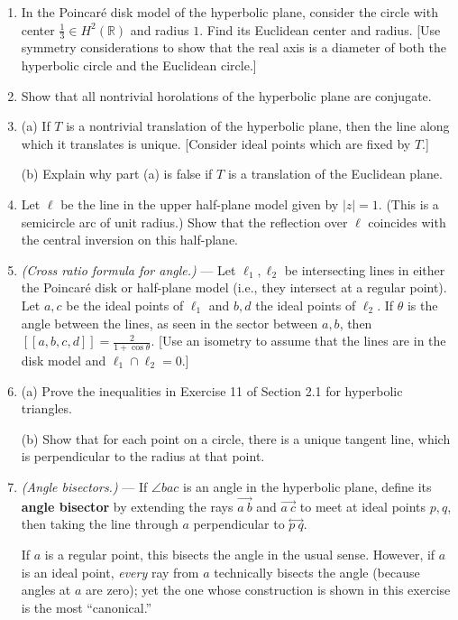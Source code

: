 \documentclass[leqno]{book}
\begin{document}
\begin{enumerate}
\item In the Poincar\'e disk model of the hyperbolic plane, consider the circle with center $\frac 13\in H^2(\mathbb R)$ and radius $1$.  Find its Euclidean center and radius.  [Use symmetry considerations to show that the real axis is a diameter of both the hyperbolic circle and the Euclidean circle.]

\item Show that all nontrivial horolations of the hyperbolic plane are conjugate.

\item (a) If $T$ is a nontrivial translation of the hyperbolic plane, then the line along which it translates is unique.  [Consider ideal points which are fixed by $T$.]

(b) Explain why part (a) is false if $T$ is a translation of the Euclidean plane.

\item Let $\ell$ be the line in the upper half-plane model given by $|z|=1$.  (This is a semicircle arc of unit radius.)  Show that the reflection over $\ell$ coincides with the central inversion on this half-plane.

\item\emph{(Cross ratio formula for angle.)} \---- Let $\ell_1,\ell_2$ be intersecting lines in either the Poincar\'e disk or half-plane model (i.e., they intersect at a regular point).  Let $a,c$ be the ideal points of $\ell_1$ and $b,d$ the ideal points of $\ell_2$.  If $\theta$ is the angle between the lines, as seen in the sector between $a,b$, then $[\![a,b,c,d]\!]=\frac 2{1+\cos\theta}$.  [Use an isometry to assume that the lines are in the disk model and $\ell_1\cap\ell_2=0$.]

\item (a) Prove the inequalities in Exercise 11 of Section 2.1 for hyperbolic triangles.

(b) Show that for each point on a circle, there is a unique tangent line, which is perpendicular to the radius at that point.

\item\emph{(Angle bisectors.)} \---- If $\angle bac$ is an angle in the hyperbolic plane, define its \textbf{angle bisector} by extending the rays $\overset{\longrightarrow}{a~b}$ and $\overset{\longrightarrow}{a~c}$ to meet at ideal points $p,q$, then taking the line through $a$ perpendicular to $\overset{\longleftrightarrow}{p~q}$. 

If $a$ is a regular point, this bisects the angle in the usual sense.  However, if $a$ is an ideal point, \emph{every} ray from $a$ technically bisects the angle (because angles at $a$ are zero); yet the one whose construction is shown in this exercise is the most ``canonical.''
\end{enumerate}
\end{document}
